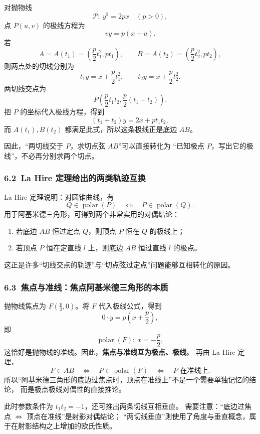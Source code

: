 \documentclass{ctexart}
\begin{document}
	对抛物线
	\[
	\mathcal P:\ y^2=2px\quad(p>0),
	\]
	点 $P(u,v)$ 的极线方程为
	\[
	\boxed{vy=p(x+u).}
	\]
	若
	\[
	A=A(t_1)=\left(\frac p2t_1^2,pt_1\right),\qquad
	B=A(t_2)=\left(\frac p2t_2^2,pt_2\right),
	\]
	则两点处的切线分别为
	\[
	t_1y=x+\frac p2t_1^2,\qquad
	t_2y=x+\frac p2t_2^2.
	\]
	两切线交点为
	\[
	P\left(\frac p2t_1t_2,\frac p2(t_1+t_2)\right).
	\]
	把 $P$ 的坐标代入极线方程，得到
	\[
	\boxed{(t_1+t_2)y=2x+pt_1t_2,}
	\]
	而 $A(t_1),B(t_2)$ 都满足此式，所以这条极线正是底边 $AB$。

	因此，``两切线交于 $P$，求切点弦 $AB$''可以直接转化为
	``已知极点 $P$，写出它的极线''，不必再分别求两个切点。

	\subsubsection*{6.2\ La Hire 定理给出的两类轨迹互换}

	La Hire 定理说明：对圆锥曲线，有
	\[
	Q\in\operatorname{polar}(P)
	\quad\Longleftrightarrow\quad
	P\in\operatorname{polar}(Q).
	\]
	用于阿基米德三角形，可得到两个非常实用的对偶结论：
	\begin{enumerate}
		\item 若底边 $AB$ 恒过定点 $Q$，则顶点 $P$ 恒在 $Q$ 的极线上；
		\item 若顶点 $P$ 恒在定直线 $l$ 上，则底边 $AB$ 恒过直线 $l$ 的极点。
	\end{enumerate}
	这正是许多``切线交点的轨迹''与``切点弦过定点''问题能够互相转化的原因。

	\subsubsection*{6.3\ 焦点与准线：焦点阿基米德三角形的本质}

	抛物线焦点为 $F(\frac p2,0)$。将 $F$ 代入极线公式，得到
	\[
	0\cdot y=p\left(x+\frac p2\right),
	\]
	即
	\[
	\boxed{\operatorname{polar}(F):\ x=-\frac p2,}
	\]
	这恰好是抛物线的准线。因此，\textbf{焦点与准线互为极点、极线}。
	再由 La Hire 定理，
	\[
	\boxed{F\in AB
	\quad\Longleftrightarrow\quad
	P\in\operatorname{polar}(F)
	\quad\Longleftrightarrow\quad
	P\text{ 在准线上}.}
	\]
	所以``阿基米德三角形的底边过焦点时，顶点在准线上''不是一个需要单独记忆的结论，
	而是极点极线对偶性的直接推论。

	此时参数条件为 $t_1t_2=-1$，还可推出两条切线互相垂直。
	需要注意：``底边过焦点 $\Longleftrightarrow$ 顶点在准线''是射影对偶结论；
	``两切线垂直''则使用了角度与垂直概念，属于在射影结构之上增加的欧氏性质。
\end{document}
